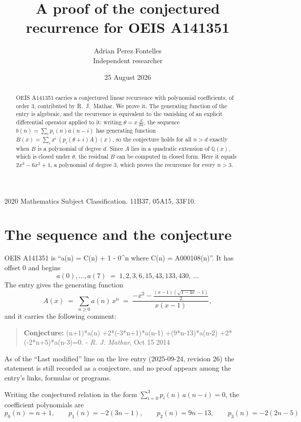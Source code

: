 \documentclass[11pt,a4paper]{article}
\title{A proof of the conjectured recurrence for OEIS A141351}
\author{Adrian Perez Fontelles\\ \small Independent researcher}
\date{25 August 2026}
\theoremstyle{plain}
\theoremstyle{definition}
\begin{document}
\maketitle

\begin{abstract}
OEIS A141351 carries a conjectured linear recurrence with polynomial coefficients, of
order 3, contributed by R.~J.~Mathar. We prove it. The generating function of the
entry is algebraic, and the recurrence is equivalent to the vanishing of an explicit
differential operator applied to it: writing $\theta=x\,\frac{d}{dx}$, the sequence
$b(n)=\sum_{i}p_{i}(n)a(n-i)$ has generating function
$B(x)=\sum_{i}x^{i}\,(p_{i}(\theta+i)A)(x)$, so the conjecture holds for all $n>d$ exactly
when $B$ is a polynomial of degree $d$. Since $A$ lies in a quadratic extension of
$\mathbb{Q}(x)$, which is closed under $\theta$, the residual $B$ can be computed in
closed form. Here it equals $2 x^{3} - 6 x^{2} + 1$, a polynomial of degree $3$, which proves
the recurrence for every $n>3$.
\end{abstract}

\noindent\small 2020 Mathematics Subject Classification. 11B37, 05A15, 33F10.\normalsize

\section{The sequence and the conjecture}

OEIS A141351 is ``a(n) = C(n) + 1 - 0\^{}n where C(n) = A000108(n)''. It has offset $0$ and begins
\[
a(0),\dots,a(7)\;=\;1, 2, 3, 6, 15, 43, 133, 430,\ \dots
\]
The entry gives the generating function
\begin{equation}\label{eq:gf}
A(x)\;=\;\sum_{n\ge 0} a(n)\,x^{n}\;=\;\frac{- x^{2} - \frac{\left(x - 1\right) \left(\sqrt{1 - 4 x} - 1\right)}{2}}{x \left(x - 1\right)} ,
\end{equation}
and it carries the following comment:
\begin{quote}\small
\textbf{Conjecture:} (n+1)*a(n) +2*(-3*n+1)*a(n-1) +(9*n-13)*a(n-2) +2*(-2*n+5)*a(n-3)=0. - \emph{R. J. Mathar}, Oct 15 2014
\end{quote}
As of the ``Last modified'' line on the live entry (2025-09-24, revision 26) the
statement is still recorded as a conjecture, and no proof appears among the entry's links,
formulas or programs.

Writing the conjectured relation in the form $\sum_{i=0}^{3}p_{i}(n)\,a(n-i)=0$,
the coefficient polynomials are
\[
p_{0}(n)=n + 1,\qquad p_{1}(n)=- 2 \left(3 n - 1\right),\qquad p_{2}(n)=9 n - 13,\qquad p_{3}(n)=- 2 \left(2 n - 5\right)
\]
\end{document}
